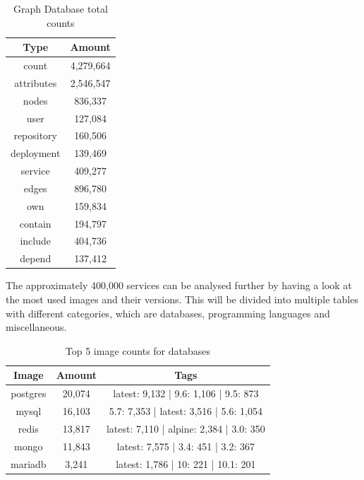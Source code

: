 \begin{table}[h!]
    \centering
    \begin{tabular}{ |c|c| }
    \hline
    Type & Amount \\
    \hline
         count & 4,279,664 \\
         attributes & 2,546,547 \\
         \hline
         nodes & 836,337 \\
         \hline
         user & 127,084 \\
         repository & 160,506\\
         deployment & 139,469\\
         service & 409,277\\
         \hline
         edges & 896,780 \\
         \hline
         own & 159,834 \\
         contain & 194,797 \\
         include & 404,736 \\
         depend & 137,412 \\
    \hline
    \end{tabular}
    \caption{Graph Database total counts}
    \label{graph_database_total_counts}
\end{table}

The approximately 400,000 services can be analysed further by having a look at the most used images and their versions. This will be divided into multiple tables with different categories, which are databases, programming languages and miscellaneous.

\begin{table}[h!]
    \centering
    \begin{tabular}{ |c|c|c| }
    \hline
    Image & Amount & Tags \\
    \hline
         postgres & 20,074 & latest: 9,132 | 9.6: 1,106 | 9.5: 873\\
         mysql & 16,103 & 5.7: 7,353 | latest: 3,516 | 5.6: 1,054\\
         redis & 13,817 & latest: 7,110 | alpine: 2,384 | 3.0: 350\\
         mongo & 11,843 & latest: 7,575 | 3.4: 451 | 3.2: 367\\
         mariadb & 3,241 & latest: 1,786 | 10: 221 | 10.1: 201\\
    \hline
    \end{tabular}
    \caption{Top 5 image counts for databases}
    \label{table_image_databases}
\end{table}

